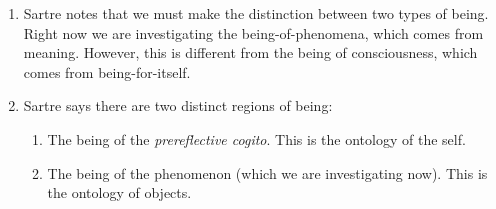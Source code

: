 \begin{enumerate}
  \item Sartre notes that we must make the distinction between two types of being. Right now we are investigating the being-of-phenomena, which comes from meaning. However, this is different from the being of consciousness, which comes from being-for-itself.
  \item Sartre says there are two distinct regions of being:
  \begin{enumerate}
    \item The being of the \emph{prereflective cogito}. This is the ontology of the self.
    \item The being of the phenomenon (which we are investigating now). This is the ontology of objects.
  \end{enumerate}
\end{enumerate}
